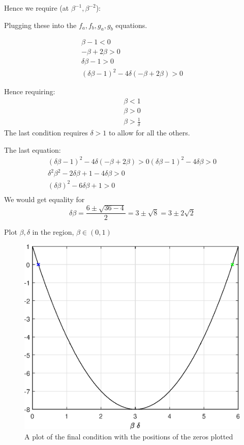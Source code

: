 \documentclass{X:/Documents/Coding/Latex/myassignment}
\begin{document}
\begin{enumerate}
\begin{enumerate}
		Hence we require (at $\beta^{-1}, \beta^{-2}$):

		Plugging these into the $f_a,f_b,g_a,g_b$ equations.

		\begin{align*}
			\beta -1  < 0 \\
			- \beta  + 2\beta > 0\\
			\delta \beta -1 > 0\\
			(\delta \beta -1)^2 - 4 \delta(- \beta  + 2\beta) > 0
		\end{align*}
		
		Hence requiring:
		\begin{align*}
			\beta < 1\\
			\beta > 0\\
			\beta > \frac{1}{\delta}
		\end{align*}
		The last condition requires $\delta > 1$ to allow for all the others.

		The last equation:
		\begin{align*}
			(\delta \beta -1)^2 - 4 \delta(- \beta  + 2\beta) > 0
			\left(\delta \beta -1\right) ^2 - 4 \delta \beta > 0\\
			\delta^2 \beta ^2 - 2 \delta \beta + 1 - 4 \delta \beta> 0\\
			(\delta \beta) ^2 - 6 \delta \beta + 1> 0\\
		\end{align*}
		We would get equality for
		\[\delta \beta = \frac{6 \pm \sqrt{36 - 4}}{2} = 3 \pm \sqrt{8} =  3 \pm 2\sqrt{2}\]

		Plot $\beta,\delta$ in the region, $\beta \in (0,1)$ 

		\begin{figure}[tbh]
			\centering
			\includegraphics[width=0.7\linewidth]{bdregion.eps}
			\caption{A plot of the final condition with the positions of the zeros plotted}
			\label{fig:quadplot}
		\end{figure}




\end{enumerate}
\end{enumerate}
\end{document}
